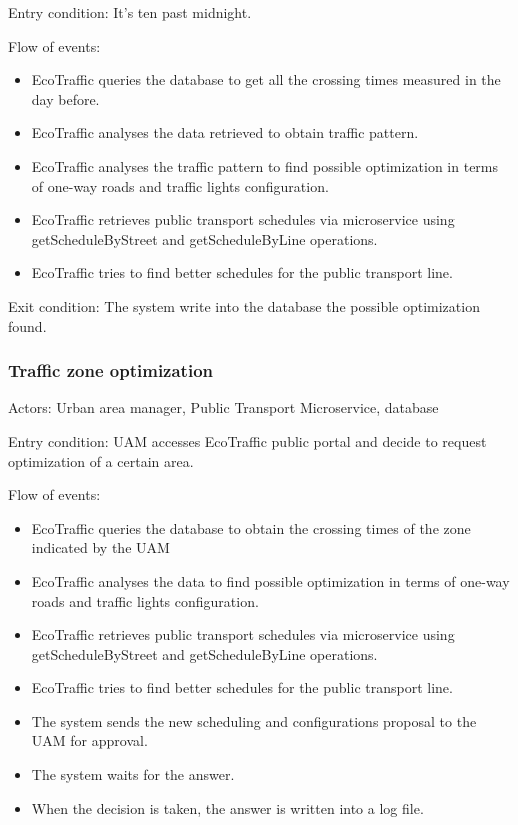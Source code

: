 \documentclass[12pt, a4paper, twoside, openright]{report}
\begin{document}
Entry condition: It's ten past midnight.

Flow of events:

\begin{itemize}
\item
  EcoTraffic queries the database to get all the crossing times measured
  in the day before.
\item
  EcoTraffic analyses the data retrieved to obtain traffic pattern.
\item
  EcoTraffic analyses the traffic pattern to find possible optimization
  in terms of one-way roads and traffic lights configuration.
\item
  EcoTraffic retrieves public transport schedules via microservice using
  getScheduleByStreet and getScheduleByLine operations.
\item
  EcoTraffic tries to find better schedules for the public transport
  line.
\end{itemize}

Exit condition: The system write into the database the possible
optimization found.


\subsubsection{Traffic zone optimization}

Actors: Urban area manager, Public Transport Microservice, database

Entry condition: UAM accesses EcoTraffic public portal and decide to
request optimization of a certain area.

Flow of events:

\begin{itemize}
\item
  EcoTraffic queries the database to obtain the crossing times of the
  zone indicated by the UAM
\item
  EcoTraffic analyses the data to find possible optimization in terms of
  one-way roads and traffic lights configuration.
\item
  EcoTraffic retrieves public transport schedules via microservice using
  getScheduleByStreet and getScheduleByLine operations.
\item
  EcoTraffic tries to find better schedules for the public transport
  line.
\item
  The system sends the new scheduling and configurations proposal to the
  UAM for approval.
\item
  The system waits for the answer.
\item
  When the decision is taken, the answer is written into a log file.
\end{itemize}
\end{document}
